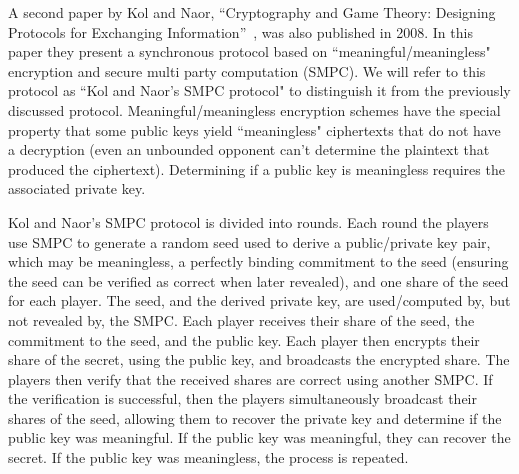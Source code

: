 \documentclass[12pt]{dalcsthesis}
\begin{document}
A second paper by Kol and Naor, ``Cryptography and Game Theory: Designing Protocols for Exchanging Information''~\cite{kol08-2}, was also published in 2008. In this paper they present a synchronous protocol based on ``meaningful/meaningless" encryption and secure multi party computation (SMPC). We will refer to this protocol as ``Kol and Naor's SMPC protocol" to distinguish it from the previously discussed protocol. Meaningful/meaningless encryption schemes have the special property that some public keys yield ``meaningless" ciphertexts that do not have a decryption (even an unbounded opponent can't determine the plaintext that produced the ciphertext). Determining if a public key is meaningless requires the associated private key. 

Kol and Naor's SMPC protocol is divided into rounds. Each round the players use SMPC to generate a random seed used to derive a public/private key pair, which may be meaningless, a perfectly binding commitment to the seed (ensuring the seed can be verified as correct when later revealed), and one share of the seed for each player. The seed, and the derived private key, are used/computed by, but not revealed by, the SMPC. Each player receives their share of the seed, the commitment to the seed, and the public key. Each player then encrypts their share of the secret, using the public key, and broadcasts the encrypted share. The players then verify that the received shares are correct using another SMPC. If the verification is successful, then the players simultaneously broadcast their shares of the seed, allowing them to recover the private key and determine if the public key was meaningful. If the public key was meaningful, they can recover the secret. If the public key was meaningless, the process is repeated.
\end{document}
